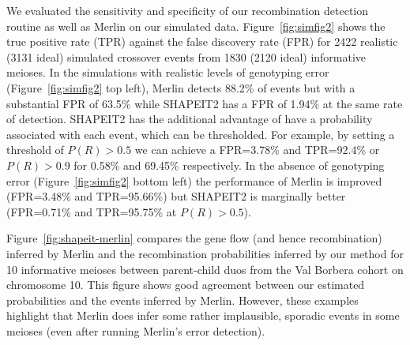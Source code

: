 We evaluated the sensitivity and specificity of our recombination detection routine as well as Merlin on our simulated data.  Figure~\ref{fig:simfig2} shows the true positive rate (TPR) against the false discovery rate (FPR) for 2422 realistic (3131 ideal) simulated crossover events from 1830 (2120 ideal) informative meioses.  In the simulations with realistic levels of genotyping error (Figure~\ref{fig:simfig2} top left), Merlin detects 88.2\% of events but with a substantial FPR of 63.5\% while SHAPEIT2 has a FPR of 1.94\% at the same rate of detection. SHAPEIT2 has the additional advantage of have a probability associated with each event, which can be thresholded. For example, by setting a threshold of $P(R)>0.5$ we can achieve a FPR=3.78\% and TPR=92.4\% or $P(R)>0.9$ for 0.58\% and 69.45\% respectively. In the absence of genotyping error (Figure~\ref{fig:simfig2} bottom left) the performance of Merlin is improved (FPR=3.48\% and TPR=95.66\%) but SHAPEIT2 is marginally better (FPR=0.71\% and TPR=95.75\% at $P(R)>0.5$).

Figure~\ref{fig:shapeit-merlin} compares the gene flow (and hence recombination) inferred by Merlin and the recombination probabilities inferred by our method for 10 informative meioses between parent-child duos from the Val Borbera cohort on chromosome 10. This figure shows  good agreement between our estimated probabilities and the events inferred by Merlin. However, these examples highlight that Merlin does infer some rather implausible, sporadic events in some meioses (even after running Merlin's error detection).

